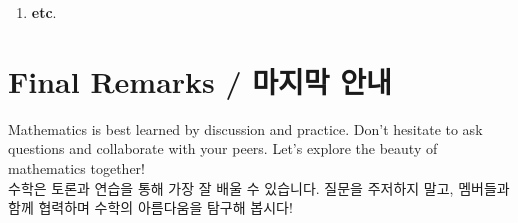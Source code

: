 \begin{enumerate}


\item[] \textbf{etc}.
\end{enumerate}

\vspace{1em}

\section*{Final Remarks / 마지막 안내}
Mathematics is best learned by discussion and practice. Don’t hesitate to ask questions
and collaborate with your peers. Let’s explore the beauty of mathematics together!\\

\noindent 수학은 토론과 연습을 통해 가장 잘 배울 수 있습니다. 질문을 주저하지 말고, 멤버들과
함께 협력하며 수학의 아름다움을 탐구해 봅시다!
	
